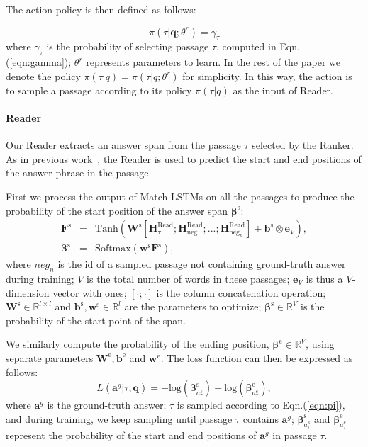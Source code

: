 \documentclass[letterpaper]{article} \usepackage{aaai18}  \usepackage{times}  \usepackage{helvet}  \usepackage{courier}  \usepackage{url}  \usepackage{graphicx}  \usepackage{comment}
\begin{document}
The action policy is then defined as follows:

\begin{equation}
\pi (\tau | \mathbf{q}; \theta^{r}) = \gamma _\tau 
\label{eqn:pi}
\end{equation}
where $\gamma _\tau $ is the probability of selecting passage $\tau$, computed in Eqn.(\ref{eqn:gamma}); $\theta^r$ represents parameters to learn. In the rest of the paper we denote the policy $\pi(\tau|q) = \pi (\tau | q; \theta^{r})$ for simplicity. In this way, the action is to sample a passage according to its policy $\pi(\tau|q)$ as the input of Reader.

\paragraph{Reader}
Our Reader extracts an answer span from the passage $\tau$ selected by the Ranker. As in previous work~\cite{wang2016machine,xiong2016dynamic,seo2016bidirectional,wang2017gated}, the Reader is used to predict the start and end positions of the answer phrase in the passage.

First we process the output of Match-LSTMs on all the passages to produce the probability of the start position of the answer span $\mathbf{\beta}^{\text{s}}$:
\begin{eqnarray}
\nonumber
\mathbf{F}^\text{s} &=& \text{Tanh}\left( \mathbf{W}^\text{s}[\mathbf{H}^{\text{Read}}_\tau;\mathbf{H}^{\text{Read}}_{\text{neg}_1};...;\mathbf{H}^{\text{Read}}_{\text{neg}_n}] + \mathbf{b}^\text{s} \otimes \mathbf{e}_{V} \right ), \\
\mathbf{\beta}^\text{s} &=& \text{Softmax}\left( \mathbf{w}^\text{s} \mathbf{F}^\text{s} \right ),
\label{eqn:span}
\end{eqnarray}
where $neg_n$ is the id of a sampled passage not containing ground-truth answer during training;
$V$ is the total number of words in these passages; $\mathbf{e}_{V}$ is thus a $V$-dimension vector with ones; $[\cdot ; \cdot]$ is the column concatenation operation; $\mathbf{W}^\text{s}\in \mathbb{R}^{l\times l}$ and $\mathbf{b}^\text{s},\mathbf{w}^\text{s}\in \mathbb{R}^{l}$ are the parameters to optimize; $\mathbf{\beta}^\text{s}\in \mathbb{R}^{V}$ is the probability of the start point of the span.

We similarly compute the probability of the ending position, $\mathbf{\beta}^\text{e}\in \mathbb{R}^{V}$, using separate parameters $\mathbf{W}^\text{e}, \mathbf{b}^\text{e}$ and $\mathbf{w}^\text{e}$.
The loss function can then be expressed as follows:
\begin{equation}
L(\mathbf{a}^g|\tau, \mathbf{q})=-\text{log} (\mathbf{\beta}^\text{s}_{a^s_\tau}) -
\text{log} (\mathbf{\beta}^\text{e}_{a^e_\tau}) , 
\label{eqn:rc_obj}
\end{equation}
where $\mathbf{a}^g$ is the ground-truth answer; $\tau$ is sampled according to Eqn.(\ref{eqn:pi}), and during training, we keep sampling until passage $\tau$ contains $\mathbf{a}^g$; $\mathbf{\beta}^\text{s}_{a^s_\tau}$ and $\mathbf{\beta}^\text{e}_{a^e_\tau}$ represent the probability of the start and end positions of $\mathbf{a}^g$ in passage $\tau$. 
\end{document}
